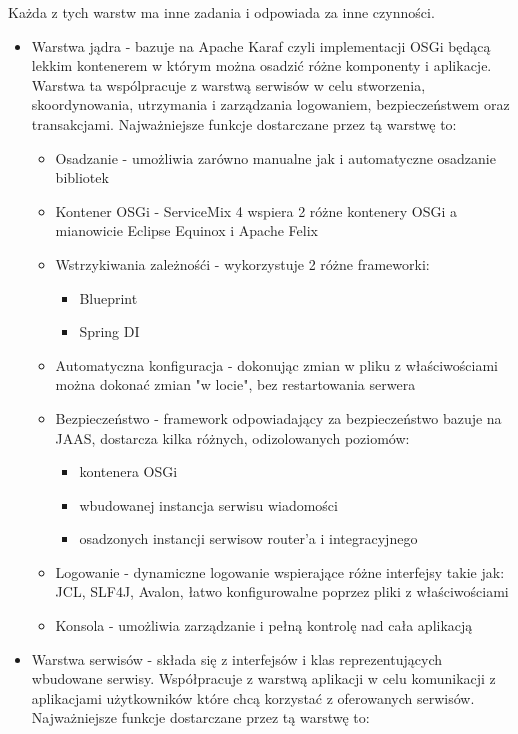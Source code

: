 Każda z tych warstw ma inne zadania i odpowiada za inne czynności.
\begin{itemize}
	\item Warstwa jądra - bazuje na Apache Karaf czyli implementacji OSGi będącą lekkim kontenerem w którym można osadzić różne komponenty i aplikacje. Warstwa ta wspólpracuje z warstwą serwisów w celu stworzenia, skoordynowania, utrzymania i zarządzania logowaniem, bezpieczeństwem oraz transakcjami. Najważniejsze funkcje dostarczane przez tą warstwę to:
	\begin{itemize}
		\item Osadzanie - umożliwia zarówno manualne jak i automatyczne osadzanie bibliotek
		\item Kontener OSGi - ServiceMix 4 wspiera 2 różne kontenery OSGi a mianowicie Eclipse Equinox i Apache Felix
		\item Wstrzykiwania zależnośći - wykorzystuje 2 różne frameworki:
			\begin{itemize}
				\item Blueprint
				\item Spring DI
			\end{itemize}   
		\item Automatyczna konfiguracja - dokonując zmian w pliku z właściwościami można dokonać zmian "w locie", bez restartowania serwera
		\item Bezpieczeństwo - framework odpowiadający za bezpieczeństwo bazuje na JAAS, dostarcza kilka różnych, odizolowanych poziomów:
			\begin{itemize}
				\item kontenera OSGi
				\item wbudowanej instancja serwisu wiadomości
				\item osadzonych instancji serwisow router'a i integracyjnego
			\end{itemize} 
		\item Logowanie - dynamiczne logowanie wspierające różne interfejsy takie jak: JCL, SLF4J, Avalon, łatwo konfigurowalne poprzez pliki z właściwościami
		\item Konsola - umożliwia zarządzanie i pełną kontrolę nad cała aplikacją
	\end{itemize}  
	\item Warstwa serwisów - 	składa się z interfejsów i klas reprezentujących wbudowane serwisy. Współpracuje z warstwą aplikacji w celu komunikacji z aplikacjami użytkowników które chcą korzystać z oferowanych serwisów. Najważniejsze funkcje dostarczane przez tą warstwę to:

\end{itemize}
